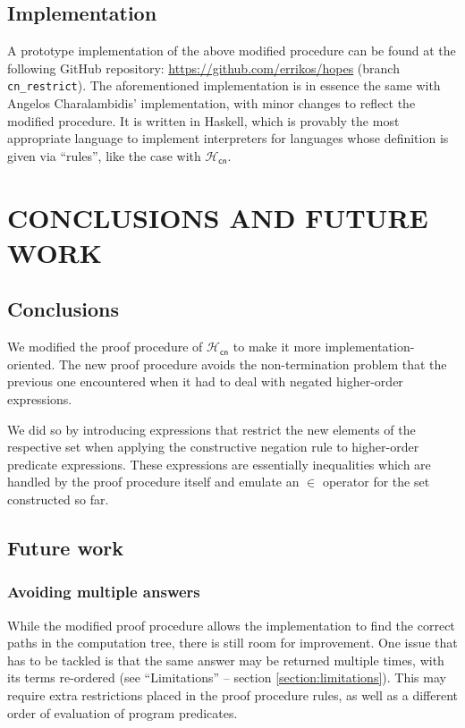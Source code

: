 \documentclass[inscr,ack,preface]{dithesis}
\theoremstyle{definition}
\newcommand{\hcn}{$\mathcal{H}_\mathsf{cn}$}
\begin{document}
\section{Implementation}
A prototype implementation of the above modified procedure can be found at the following GitHub repository: \url{https://github.com/errikos/hopes} (branch \texttt{cn\_restrict}). The aforementioned implementation is in essence the same with Angelos Charalambidis' implementation, with minor changes to reflect the modified procedure. It is written in Haskell, which is provably the most appropriate language to implement interpreters for languages whose definition is given via ``rules'', like the case with \hcn{}.

\chapter{CONCLUSIONS AND FUTURE WORK}
\label{chap:conclusion}

\section{Conclusions}
We modified the proof procedure of \hcn{} to make it more implementation-oriented. The new proof procedure avoids the non-termination problem that the previous one encountered when it had to deal with negated higher-order expressions.

We did so by introducing expressions that restrict the new elements of the respective set when applying the constructive negation rule to higher-order predicate expressions. These expressions are essentially inequalities which are handled by the proof procedure itself and emulate an $\in$ operator for the set constructed so far.

\section{Future work}
\subsection*{Avoiding multiple answers}
While the modified proof procedure allows the implementation to find the correct paths in the computation tree, there is still room for improvement. One issue that has to be tackled is that the same answer may be returned multiple times, with its terms re-ordered (see ``Limitations'' -- section \ref{section:limitations}). This may require extra restrictions placed in the proof procedure rules, as well as a different order of evaluation of program predicates.
\end{document}
